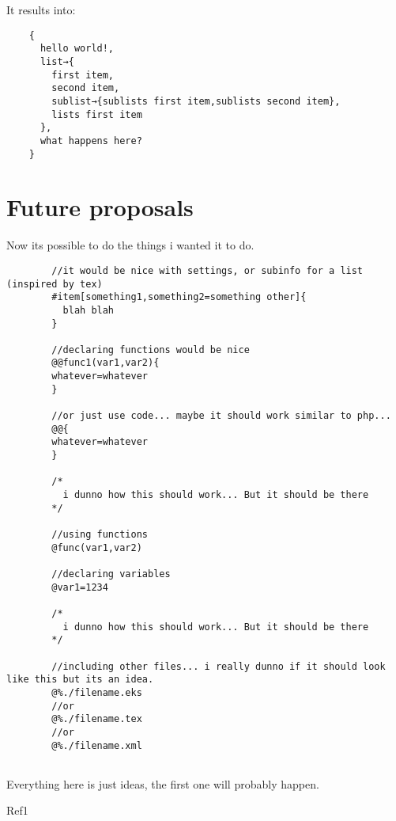 \documentclass{book}
\begin{document}
	It results into:
	
	\begin{verbatim}
	{
	  hello world!,
	  list→{
	    first item,
	    second item,
	    sublist→{sublists first item,sublists second item},
	    lists first item
	  },
	  what happens here?
	}
	\end{verbatim}
	
	\chapter{Future proposals}
	
	Now its possible to do the things i wanted it to do.
	
	\begin{verbatim}
		//it would be nice with settings, or subinfo for a list (inspired by tex)
		#item[something1,something2=something other]{
		  blah blah
		}
		
		//declaring functions would be nice
		@@func1(var1,var2){
		whatever=whatever
		}
		
		//or just use code... maybe it should work similar to php...
		@@{
		whatever=whatever
		}
		
		/*
		  i dunno how this should work... But it should be there
		*/
		
		//using functions
		@func(var1,var2)
		
		//declaring variables
		@var1=1234
		
		/*
		  i dunno how this should work... But it should be there
		*/
		
		//including other files... i really dunno if it should look like this but its an idea.
		@%./filename.eks
		//or
		@%./filename.tex
		//or
		@%./filename.xml		
		
	\end{verbatim}
	
	Everything here is just ideas, the first one will probably happen.
	
	\begin{thebibliography}{1}
	
		Ref1
	
	\end{thebibliography}
	
	
\end{document}
